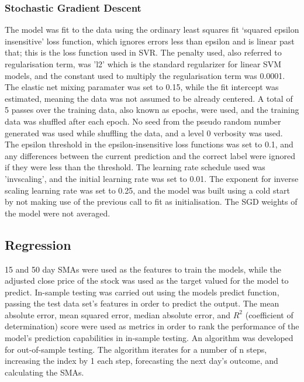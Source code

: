\subsubsection{Stochastic Gradient Descent}
The model was fit to the data using the ordinary least squares fit ‘squared epsilon insensitive’ loss function, which ignores errors less than epsilon and is linear past that; this is the loss function used in SVR. The penalty used, also referred to regularisation term,  was 'l2' which is the standard regularizer for linear SVM models, and the constant used to multiply the regularisation term was 0.0001. The elastic net mixing paramater was set to 0.15, while the fit intercept was estimated, meaning the data was not assumed to be already centered. A total of 5 passes over the training data, also known as epochs, were used, and the training data was shuffled after each epoch. No seed from the pseudo random number generated was used while shuffling the data, and a level 0 verbosity was used. The epsilon threshold in the epsilon-insensitive loss functions was set to 0.1, and any differences between the current prediction and the correct label were ignored if they were less than the threshold. The learning rate schedule used was 'invscaling', and the initial learning rate was set to 0.01. The exponent for inverse scaling learning rate was set to 0.25, and the model was built using a cold start by not making use of the previous call to fit as initialisation. The SGD weights of the model were not averaged.

\subsection{Regression}
15 and 50 day SMAs were used as the features to train the models, while the adjusted close price of the stock was used as the target valued for the model to predict. In-sample testing was carried out using the models predict function, passing the test data set's features in order to predict the output. The mean absolute error, mean squared error, median absolute error, and $R^{2}$ (coefficient of determination) score were used as metrics in order to rank the performance of the model's prediction capabilities in in-sample testing. An algorithm was developed for out-of-sample testing. The algorithm iterates for a number of n steps, increasing the index by 1 each step, forecasting the next day's outcome, and calculating the SMAs. 


